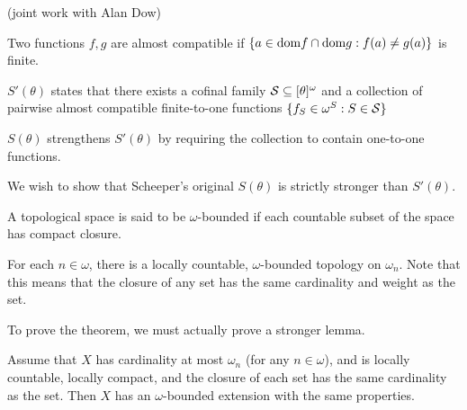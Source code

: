 \documentclass[11pt]{article}
\begin{document}
  (joint work with Alan Dow)

  \begin{definition}
    Two functions \(f,g\) are almost compatible if
    \(\{a\in\textrm{dom} f\cap\textrm{dom} g:f(a)\not=g(a)\}\) is finite.
  \end{definition}

  \begin{definition}
    \(S'(\theta)\) states that there exists a cofinal family
    \(\mathcal{S}\subseteq[\theta]^{\omega}\) and a collection of pairwise
    almost compatible
    finite-to-one functions \(\{f_S\in\omega^S:S\in\mathcal{S}\}\)
  \end{definition}

  \begin{definition}
    \(S(\theta)\) strengthens \(S'(\theta)\) by requiring the collection
    to contain one-to-one functions.
  \end{definition}

  We wish to show that Scheeper's original \(S(\theta)\) is strictly stronger
  than \(S'(\theta)\).

  \begin{definition}
    A topological space is said to be \(\omega\)-bounded if each countable
    subset of the space has compact closure.
  \end{definition}


          \begin{theorem}
           For each $n\in \omega$, there is a locally countable,
            $\omega$-bounded topology on $\omega_n$. Note
            that this means that the closure of any set has
            the same cardinality and weight as the set.
          \end{theorem}


          To prove the theorem, we must actually prove a stronger lemma.

          \begin{lemma}
          Assume that $X$ has cardinality at most $\omega_n$ (for
          any $n\in \omega$),
          and is locally countable, locally compact, and the closure
          of each set has the same cardinality as the set.
          Then $X$ has an $\omega$-bounded extension with the
          same properties.
          \end{lemma}
\end{document}
